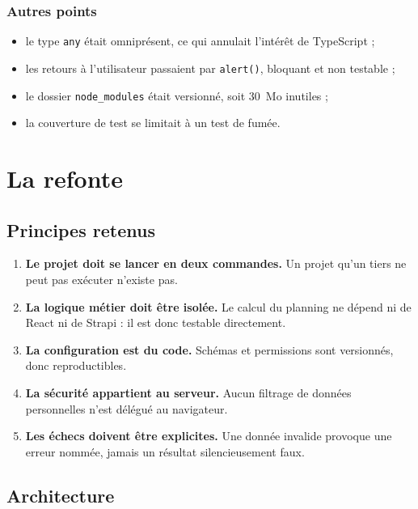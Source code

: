 \documentclass[11pt,a4paper]{report}
\begin{document}
\subsection{Autres points}

\begin{itemize}[nosep]
  \item le type \texttt{any} était omniprésent, ce qui annulait l'intérêt de
        TypeScript ;
  \item les retours à l'utilisateur passaient par \texttt{alert()}, bloquant et
        non testable ;
  \item le dossier \texttt{node\_modules} était versionné, soit 30~Mo inutiles ;
  \item la couverture de test se limitait à un test de fumée.
\end{itemize}

\chapter{La refonte}
\label{chap:refonte}

\section{Principes retenus}

\begin{enumerate}[leftmargin=0.8cm]
  \item \textbf{Le projet doit se lancer en deux commandes.} Un projet qu'un tiers
        ne peut pas exécuter n'existe pas.
  \item \textbf{La logique métier doit être isolée.} Le calcul du planning ne
        dépend ni de React ni de Strapi : il est donc testable directement.
  \item \textbf{La configuration est du code.} Schémas et permissions sont
        versionnés, donc reproductibles.
  \item \textbf{La sécurité appartient au serveur.} Aucun filtrage de données
        personnelles n'est délégué au navigateur.
  \item \textbf{Les échecs doivent être explicites.} Une donnée invalide provoque
        une erreur nommée, jamais un résultat silencieusement faux.
\end{enumerate}

\section{Architecture}
\end{document}
